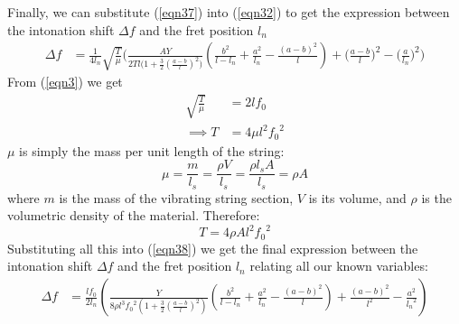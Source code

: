 Finally, we can substitute (\ref{eqn37}) into (\ref{eqn32}) to get the expression between the intonation shift $\Delta f$ and the fret position $l_n$
\begin{align}
    \Delta f &= \frac{1}{4l_n} \sqrt{\frac{T}{\mu}} \bigg( \frac{AY}{2Tl \big(1 + \frac{3}{2}(\frac{a-b}{l})^2\big)} \left( \frac{b^2}{l-l_n} + \frac{a^2}{l_n} - \frac{(a-b)^2}{l} \right) + \Big(\frac{a-b}{l}\Big)^2 - \Big(\frac{a}{l_n}\Big)^2 \bigg) \label{eqn38}
\end{align}
From (\ref{eqn3}) we get
\begin{align*}
    \sqrt{\frac{T}{\mu}} &= 2lf_0 \\
    \implies T &= 4\mu l^2{f_0}^2    
\end{align*}
$\mu$ is simply the mass per unit length of the string:
\begin{equation*}
    \mu = \frac{m}{l_s} = \frac{\rho V}{l_s} = \frac{\rho l_s A}{l_s} = \rho A
\end{equation*}
where $m$ is the mass of the vibrating string section, $V$ is its volume, and $\rho$ is the volumetric density of the material. Therefore:
\begin{equation*}
    T = 4\rho A l^2{f_0}^2    
\end{equation*}
Substituting all this into (\ref{eqn38}) we get the final expression between the intonation shift $\Delta f$ and the fret position $l_n$ relating all our known variables:
\begin{align}
    \Delta f &= \frac{l f_0}{2l_n} \left( \frac{Y}{8\rho l^3 {f_0}^2 (1 + \frac{3}{2}(\frac{a-b}{l})^2)} \left( \frac{b^2}{l-l_n} + \frac{a^2}{l_n} - \frac{(a-b)^2}{l} \right) + \frac{(a-b)^2}{l^2} - \frac{a^2}{{l_n}^2} \right) \label{eqn39}
\end{align}